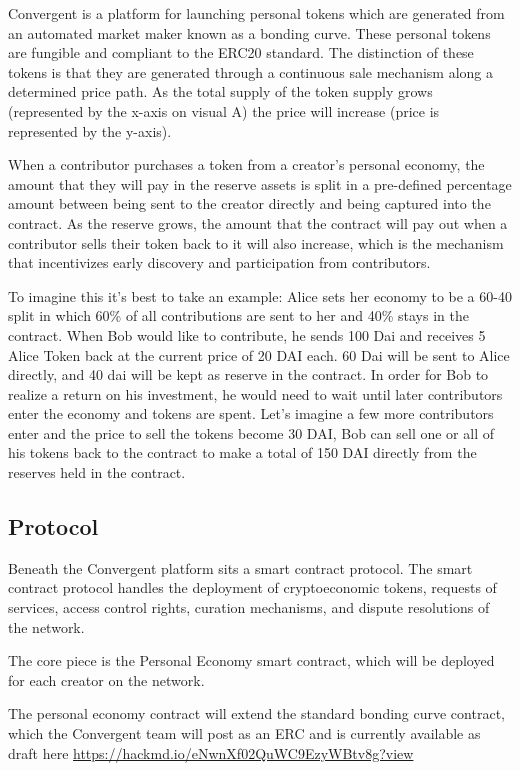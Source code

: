 \documentclass[a4paper, 10pt]{article}
\begin{document}
Convergent is a platform for launching personal tokens which are generated from an automated market maker known as a bonding curve. These personal tokens are fungible and compliant to the ERC20 standard. The distinction of these tokens is that they are generated  through a continuous sale mechanism along a determined price path. As the total supply of the token supply grows (represented by the x-axis on visual A) the price will increase (price is represented by the y-axis).
    
When a contributor purchases a token from a creator’s personal economy, the amount that they will pay in the reserve assets is split in a pre-defined percentage amount between being sent to the creator directly and being captured into the contract. As the reserve grows, the amount that the contract will pay out when a contributor sells their token back to it will also increase, which is the mechanism that incentivizes early discovery and participation from contributors. 

To imagine this it’s best to take an example: Alice sets her economy to be a 60-40 split in which 60\% of all contributions are sent to her and 40\% stays in the contract. When Bob would like to contribute, he sends 100 Dai and receives 5 Alice Token back at the current price of 20 DAI each. 60 Dai will be sent to Alice directly, and 40 dai will be kept as reserve in the contract. In order for Bob to realize a return on his investment, he would need to wait until later contributors enter the economy and tokens are spent. Let’s imagine a few more contributors enter and the price to sell the tokens become 30 DAI, Bob can sell one or all of his tokens back to the contract to make a total of 150 DAI directly from the reserves held in the contract.

\subsection{Protocol}

Beneath the Convergent platform sits a smart contract protocol. The smart contract protocol handles the deployment of cryptoeconomic tokens, requests of services, access control rights, curation mechanisms, and dispute resolutions of the network. 

The core piece is the Personal Economy smart contract, which will be deployed for each creator on the network.

The personal economy contract will extend the standard bonding curve contract, which the Convergent team will post as an ERC and is currently available as draft here \url{https://hackmd.io/eNwnXf02QuWC9EzyWBtv8g?view}
\end{document}
